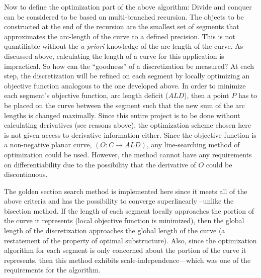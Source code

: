Now to define the optimization part of the above algorithm: Divide and conquer can be considered to be based on multi-branched recursion. The objects to be constructed at the end of the recursion are the smallest set of segments that approximates the arc-length of the curve to a defined precision. This is not quantifiable without the {\it{a priori}} knowledge of the arc-length of the curve. As discussed above, calculating the length of a curve for this application is impractical. So how can the ``goodness'' of a discretization be measured? At each step, the discretization will be refined on each segment by locally optimizing an objective function analogous to the one developed above. In order to minimize each segment’s objective function, arc length deficit ($ALD$), then a point $P$ has to be placed on the curve between the segment such that the new sum of the arc lengths is changed maximally. Since this entire project is to be done without calculating derivatives (see reasons above), the optimization scheme chosen here is not given access to derivative information either. Since the objective function is a non-negative planar curve, $(O: C \rightarrow ALD)$, any line-searching method of optimization could be used. However, the method cannot have any requirements on differentiability due to the possibility that the derivative of $O$ could be discontinuous.

The golden section search method is implemented here since it meets all of the above criteria and has the possibility to converge superlinearly \cite{brent73}--unlike the bisection method. If the length of each segment locally approaches the portion of the curve it represents (local objective function is minimized), then the global length of the discretization approaches the global length of the curve (a restatement of the property of optimal substructure). Also, since the optimization algorithm for each segment is only concerned about the portion of the curve it represents, then this method exhibits scale-independence—which was one of the requirements for the algorithm.

